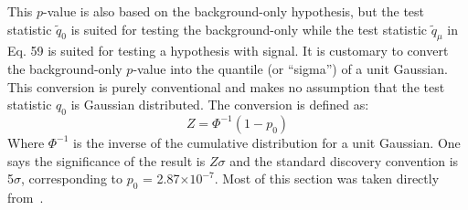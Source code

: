 This $p$-value is also based on the background-only hypothesis, but the test statistic $\tilde q_{0}$ is suited for testing the background-only while the test statistic $\tilde q_{\mu}$ in Eq. 59 is suited for testing a hypothesis with signal.
It is customary to convert the background-only $p$-value into the quantile (or ``sigma'') of a unit Gaussian.
This conversion is purely conventional and makes no assumption that the test statistic $q_{0}$ is Gaussian distributed.
The conversion is defined as:
\begin{equation}
    Z = \Phi^{-1}(1-p_{0})
\end{equation}
Where $\Phi^{-1}$ is the inverse of the cumulative distribution for a unit Gaussian.
One says the significance of the result is $Z\sigma$ and the standard discovery convention is 5$\sigma$, corresponding to $p_{0}$ = 2.87$\times 10^{-7}$.
Most of this section was taken directly from~\cite{Cranmer:2014lly}.

